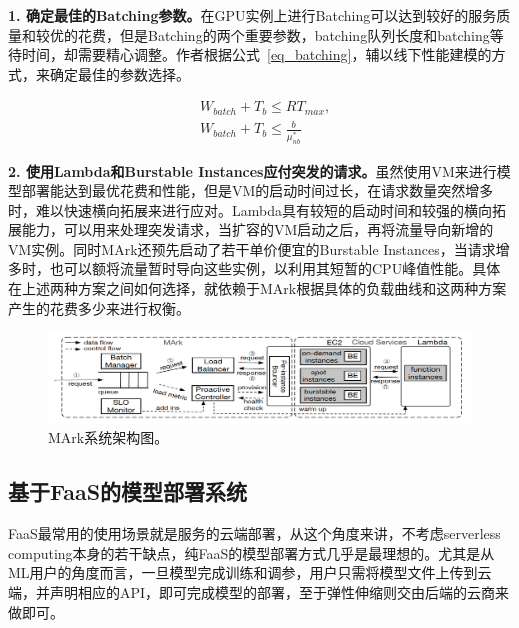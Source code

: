 \textbf{1. 确定最佳的Batching参数。}在GPU实例上进行Batching可以达到较好的服务质量和较优的花费，但是Batching的两个重要参数，batching队列长度和batching等待时间，却需要精心调整。作者根据公式~\ref{eq_batching}，辅以线下性能建模的方式，来确定最佳的参数选择。

\begin{equation}\label{eq_batching}
    \begin{aligned}
        &W_{batch} + T_b \leq RT_{max}, \\
        &W_{batch} + T_b \leq \frac{b}{\mu^*_{nb}}
    \end{aligned}
\end{equation}

\textbf{2. 使用Lambda和Burstable Instances应付突发的请求。}虽然使用VM来进行模型部署能达到最优花费和性能，但是VM的启动时间过长，在请求数量突然增多时，难以快速横向拓展来进行应对。Lambda具有较短的启动时间和较强的横向拓展能力，可以用来处理突发请求，当扩容的VM启动之后，再将流量导向新增的VM实例。同时MArk还预先启动了若干单价便宜的Burstable Instances，当请求增多时，也可以额将流量暂时导向这些实例，以利用其短暂的CPU峰值性能。具体在上述两种方案之间如何选择，就依赖于MArk根据具体的负载曲线和这两种方案产生的花费多少来进行权衡。

\begin{figure}[h]
    \centerline{\includegraphics[width=\textwidth]{figures/mark-arch.png}}
    \caption{MArk系统架构图。}
    \label{mark_arch}
\end{figure}

\subsection{基于FaaS的模型部署系统}
FaaS最常用的使用场景就是服务的云端部署，从这个角度来讲，不考虑serverless computing本身的若干缺点，纯FaaS的模型部署方式几乎是最理想的。尤其是从ML用户的角度而言，一旦模型完成训练和调参，用户只需将模型文件上传到云端，并声明相应的API，即可完成模型的部署，至于弹性伸缩则交由后端的云商来做即可。

